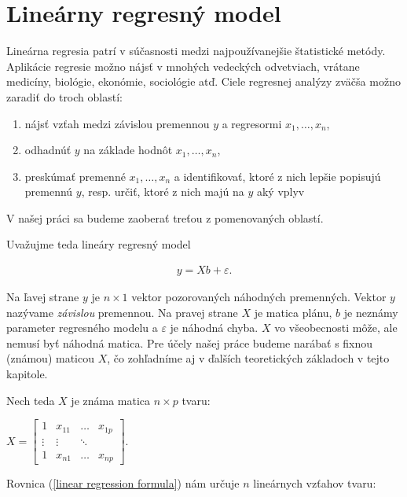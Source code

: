 \section{Lineárny regresný model}
\label{linear regression}
 
Lineárna regresia patrí v súčasnosti medzi najpoužívanejšie štatistické metódy. Aplikácie regresie možno nájsť v mnohých vedeckých odvetviach, 
vrátane medicíny, biológie, ekonómie, sociológie atď. Ciele regresnej analýzy zväčša možno zaradiť do troch oblastí:

\begin{enumerate}
  \item nájsť vzťah medzi závislou premennou $y$ a regresormi $x_1, \ldots, x_n$,
  \item odhadnúť $y$ na základe hodnôt $x_1, \ldots, x_n$,
  \item preskúmať premenné $x_1, \ldots, x_n$ a identifikovať, ktoré z nich lepšie popisujú premennú $y$, resp. určiť, ktoré z nich majú na $y$ aký vplyv
\end{enumerate}

V našej práci sa budeme zaoberať treťou z pomenovaných oblastí.

Uvažujme teda lineáry regresný model

\begin{align}
\label{linear regression formula}
y = Xb + \varepsilon .
\end{align}

Na ľavej strane $y$ je $n \times 1$ vektor pozorovaných náhodných premenných. Vektor $y$ nazývame \emph{závislou} premennou.
Na pravej strane $X$ je matica plánu, $b$ je neznámy parameter regresného modelu a $\varepsilon$ je náhodná chyba.
$X$ vo všeobecnosti môže, ale nemusí byť náhodná matica. Pre účely našej práce budeme narábať s fixnou (známou) maticou $X$,
čo zohľadníme aj v ďalších teoretických základoch v tejto kapitole.

Nech teda $X$ je známa matica $n \times p$ tvaru:

\begin{center}
$
X =
\begin{bmatrix}
1 & x_{11} & \ldots & x_{1p} \\
\vdots & \vdots & \ddots & \\
1 & x_{n1} & \ldots & x_{np} 
\end{bmatrix}
$.
\end{center}

Rovnica (\ref{linear regression formula}) nám určuje $n$ lineárnych vzťahov tvaru:

